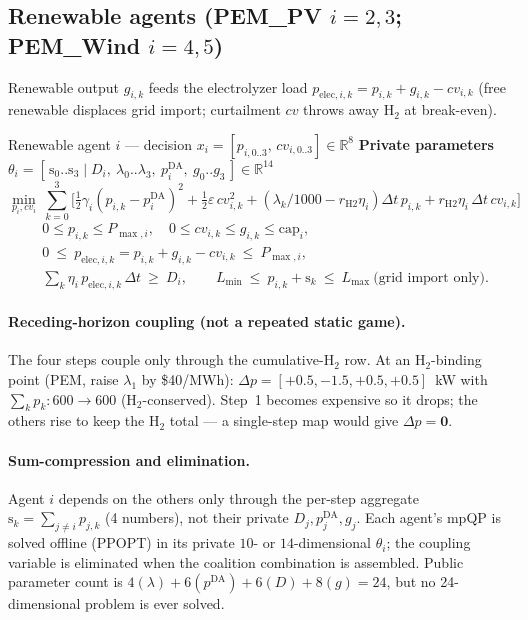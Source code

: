 \documentclass[11pt, letterpaper]{article}
\begin{document}
\subsection{Renewable agents (PEM\_PV $i{=}2,3$; PEM\_Wind $i{=}4,5$)}
Renewable output $g_{i,k}$ feeds the electrolyzer load $p_{\mathrm{elec},i,k}=p_{i,k}+g_{i,k}-cv_{i,k}$
(free renewable displaces grid import; curtailment $cv$ throws away H$_2$ at break-even).
\begin{agentbox}{Renewable agent $i$ --- decision $x_i=[p_{i,0..3},\,cv_{i,0..3}]\in\mathbb R^8$}
\textbf{Private parameters} $\theta_i=[\,\mathrm{s}_0..\mathrm{s}_3\mid D_i,\ \lambda_0..\lambda_3,\ p^{\mathrm{DA}}_i,\ g_0..g_3\,]\in\mathbb R^{14}$
\[
\min_{p_i,cv_i}\ \sum_{k=0}^{3}\Big[\tfrac12\gamma_i(p_{i,k}-p^{\mathrm{DA}}_i)^2+\tfrac12\varepsilon\,cv_{i,k}^2
  +(\lambda_k/1000-r_{\mathrm{H2}}\eta_i)\Delta t\,p_{i,k}+r_{\mathrm{H2}}\eta_i\,\Delta t\,cv_{i,k}\Big]
\]
\vspace{-8pt}
\[
\begin{aligned}
&0\le p_{i,k}\le P_{\max,i},\quad 0\le cv_{i,k}\le g_{i,k}\le\mathrm{cap}_i,\\
&0\ \le\ p_{\mathrm{elec},i,k}=p_{i,k}+g_{i,k}-cv_{i,k}\ \le\ P_{\max,i},\\
&\textstyle\sum_{k}\eta_i\,p_{\mathrm{elec},i,k}\,\Delta t\ \ge\ D_i,\qquad
L_{\min}\ \le\ p_{i,k}+\mathrm{s}_k\ \le\ L_{\max}\ \text{(grid import only)}.
\end{aligned}
\]
\end{agentbox}

\paragraph{Receding-horizon coupling (not a repeated static game).} The four steps couple only
through the cumulative-H$_2$ row. At an H$_2$-binding point (PEM, raise $\lambda_1$ by \$40/MWh):
$\Delta p=[+0.5,-1.5,+0.5,+0.5]$~kW with $\sum_k p_k:600\to600$ (H$_2$-conserved). Step~1 becomes
expensive so it drops; the others rise to keep the H$_2$ total --- a single-step map would give
$\Delta p=\mathbf0$.

\paragraph{Sum-compression and elimination.} Agent $i$ depends on the others only through the
per-step aggregate $\mathrm{s}_k=\sum_{j\ne i}p_{j,k}$ (4 numbers), not their private
$D_j,p^{\mathrm{DA}}_j,g_j$. Each agent's mpQP is solved offline (PPOPT) in its private $10$- or
$14$-dimensional $\theta_i$; the coupling variable is eliminated when the coalition combination is
assembled. Public parameter count is $4(\lambda)+6(p^{\mathrm{DA}})+6(D)+8(g)=24$, but no
24-dimensional problem is ever solved.
\end{document}
